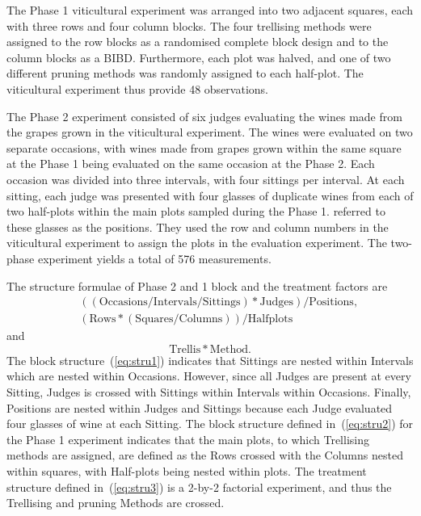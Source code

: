 \documentclass[article]{jss}
\begin{document}
The Phase 1 viticultural experiment was arranged into two adjacent squares, each with three rows and four column blocks. The four trellising methods were assigned to the row blocks as a randomised complete block design and to the column blocks as a BIBD. Furthermore, each plot was halved, and one of two different pruning methods was randomly assigned to each half-plot. The viticultural experiment thus provide 48 observations.

The Phase 2 experiment consisted of six judges evaluating the wines made from the grapes grown in the viticultural experiment. The wines were evaluated on two separate occasions, with wines made from grapes grown within the same square at the Phase 1 being evaluated on the same occasion at the Phase 2. Each occasion was divided into three intervals, with four sittings per interval. At each sitting, each judge was presented with four glasses of duplicate wines from each of two half-plots within the main plots sampled during the Phase 1. \cite{Brien1999} referred to these glasses as the positions. They used the row and column numbers in the viticultural experiment to assign the plots in the evaluation experiment. The two-phase experiment yields a total of 576 measurements.

The structure formulae of Phase 2 and 1 block and the treatment factors are
\begin{eqnarray}
\label{eq:stru1}&&\mathrm{((Occasions/Intervals/Sittings)*Judges)/Positions,}\\
\label{eq:stru2}&&\mathrm{(Rows*(Squares/Columns))/Halfplots}
\end{eqnarray}
and
\begin{equation}\label{eq:stru3}
\mathrm{Trellis*Method.}
\end{equation}
The block structure~(\ref{eq:stru1}) indicates that Sittings are nested within Intervals which are nested within Occasions. However, since all Judges are present at every Sitting, Judges is crossed with Sittings within Intervals within Occasions. Finally, Positions are nested within Judges and Sittings because each Judge evaluated four glasses of wine at each Sitting. The block structure defined in~(\ref{eq:stru2}) for the Phase 1 experiment indicates that the main plots, to which Trellising methods are assigned, are defined as the Rows crossed with the Columns nested within squares, with Half-plots being nested within plots. The treatment structure defined in~(\ref{eq:stru3}) is a 2-by-2 factorial experiment, and thus the Trellising and pruning Methods are crossed.
\end{document}
